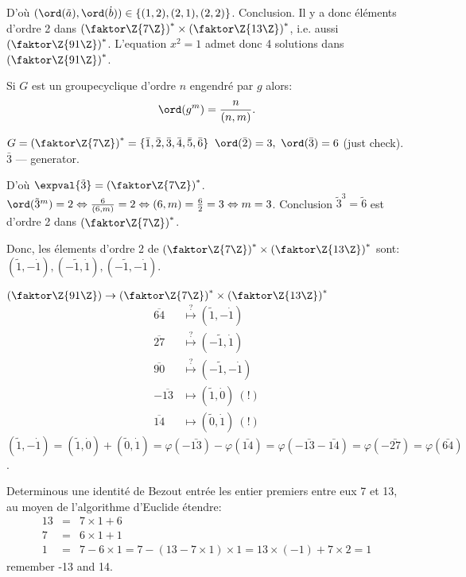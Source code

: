 D'où $(\ord(\tilde a),\ord(\dot b))\in \{(1,2),(2,1),(2,2)\}$. Conclusion. Il y a donc  éléments d'ordre 2 dans $\left( \faktor\Z{7\Z} \right)^\ast \times \left( \faktor\Z{13\Z} \right)^\ast$, i.e. aussi $\left(\faktor\Z{91\Z}\right)^\ast$. L'equation $x^2=1$ admet donc 4 solutions dans $\left(\faktor\Z{91\Z}\right)^\ast$.

\begin{rappel}
	Si $G$ est un groupecyclique d'ordre $n$ engendré par $g$ alors:
	$$\ord(g^m)=\frac n{(n,m)}.$$
	\begin{remark}
		$G=\left(\faktor\Z{7\Z}\right)^\ast=\{\bar 1, \bar 2, \bar 3,\bar 4,\bar 5,\bar 6\}$
		$\ord(\bar 2)=3,\ \ord(\bar 3)=6$ (just check). $\bar 3$ --- generator.
	\end{remark}
	D'où $\expval{\tilde 3}=\left(\faktor\Z{7\Z}\right)^\ast$.
	$\ord(\tilde 3^m)=2\Leftrightarrow \frac 6{(6,m)}=2\Leftrightarrow (6,m)=\frac 62 = 3 \Leftrightarrow m=3$. Conclusion $\tilde 3^3=\tilde 6$ est d'ordre 2 dans $\left(\faktor\Z{7\Z}\right)^\ast$.
	
	Donc, les élements d'ordre 2 de $\left(\faktor\Z{7\Z}\right)^\ast\times\left(\faktor\Z{13\Z}\right)^\ast$ sont: $(\tilde 1, -\dot 1),(-\tilde 1, \dot 1),(-\tilde 1, -\dot 1)$. 
	
	$\left(\faktor\Z{91\Z}\right)\rightarrow\left(\faktor\Z{7\Z}\right)^\ast\times\left(\faktor\Z{13\Z}\right)^\ast$
	\begin{align*}
		\overline{64}  &\overset{?}{\mapsto} (\tilde 1, -\dot 1)\\
		\overline{27}  &\overset{?}{\mapsto} (-\tilde 1, \dot 1)\\
		\overline{90}  &\overset{?}{\mapsto} (-\tilde 1, -\dot 1)\\
		-\overline{13}  &\mapsto (\tilde 1, \dot 0)\ (!)\\
		\overline{14}  &\mapsto (\tilde 0, \dot 1)\ (!)
	\end{align*}
	$(\tilde 1, -\dot 1)=(\tilde 1, \dot 0)+(\tilde 0, \dot 1)=\varphi (-\bar{13})-\varphi (\bar{14})=\varphi (-\bar{13}-\bar{14})=\varphi (-\bar{27})=\varphi (\bar{64})$.
	
	Determinous une identité de Bezout entrée les entier premiers entre eux 7 et 13, au moyen de l'algorithme d'Euclide étendre:
	\begin{align*}
		13 &=& 7\times 1+ 6\\
		7 &=& 6\times 1+1\\
		1 &=& 7-6\times 1=7-(13-7\times 1)\times 1=13\times (-1)+7\times 2=1
	\end{align*}
	remember -13 and 14.
\end{rappel}

